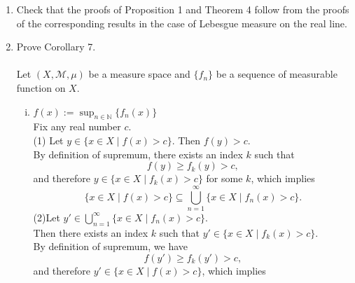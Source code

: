 \begin{enumerate}
    \item Check that the proofs of Proposition 1 and Theorem 4 follow from the proofs of the corresponding results in the case of Lebesgue measure on the real line.
    \item Prove Corollary 7.\\
    \\Let $(X,\mathcal{M},\mu)$ be a measure space and $\{f_n\}$ be a sequence of measurable function on $X$.
    \\\begin{enumerate}[(i)]
        \item $f(x):=\sup_{n\in\mathbb{N}}\{f_n(x)\}$
        \\Fix any real number $c$.
        \\(1) Let $y\in\{x\in X\mid f(x)>c\}$.
        Then $f(y)>c$.
        \\By definition of supremum, there exists an index $k$ such that 
        \[
            f(y)\ge f_k(y)>c,
        \]
        and therefore $y\in\{x\in X\mid f_k(x)>c\}$ for some $k$, which implies
        \[
            \{x\in X\mid f(x)>c\}\subseteq\bigcup_{n=1}^\infty\{x\in X\mid f_n(x)>c\}.\tag{1}
        \]
        (2)Let $y'\in\bigcup_{n=1}^\infty\{x\in X\mid f_n(x)>c\}$.
        \\Then there exists an index $k$ such that $y'\in\{x\in X\mid f_k(x)>c\}$.
        \\By definition of supremum, we have 
        \[
            f(y')\ge f_k(y')>c,
        \]
        and therefore $y'\in\{x\in X\mid f(x)>c\}$, which implies
        

\end{enumerate}
\end{enumerate}
